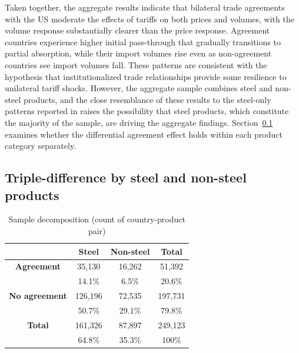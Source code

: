 Taken together, the aggregate results indicate that bilateral trade agreements with the US moderate the effects of tariffs on both  prices and volumes, with the volume response substantially clearer than the price response. Agreement countries experience higher initial pass-through that gradually transitions to partial absorption, while their import volumes rise even as non-agreement countries see import volumes fall. These patterns are consistent with the hypothesis that institutionalized trade relationships provide some resilience to unilateral tariff shocks. However, the aggregate sample combines steel and non-steel products, and the close resemblance of these results to the steel-only patterns reported in \autocite{amiti_whos_2020} raises the possibility that steel products, which constitute the majority of the sample, are driving the aggregate findings. Section~\ref{sec:steel_heterogeneity_results} examines whether the differential agreement effect holds within each product category separately.

\subsection{Triple-difference by steel and non-steel products}\label{sec:steel_heterogeneity_results}

\begin{table}[H]
\centering
\caption{Sample decomposition (count of country-product pair)}\label{tab:steel_share}
    \begin{tabular}{c | cc | c}
    \hline
    & \textbf{Steel} & \textbf{Non-steel} & \textbf{Total} \\
    \hline 
                \textbf{Agreement} & 35,130 & 16,262 & 51,392 \\
                & 14.1\% & 6.5\% & 20.6\% \\

                \textbf{No agreement} & 126,196 & 72,535 & 197,731 \\
                & 50.7\% & 29.1\% & 79.8\% \\
            \hline
                \textbf{Total} & 161,326 & 87,897 & 249,123 \\
                & 64.8\% & 35.3\% & 100\% \\        
    \end{tabular}
\end{table}

